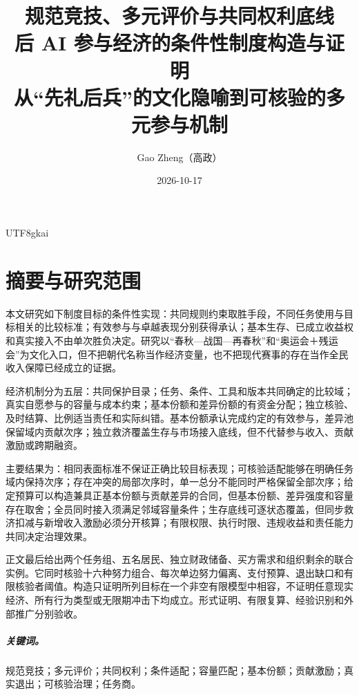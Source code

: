 \documentclass[12pt,a4paper,openany]{report}
\begin{document}
\begin{CJK*}{UTF8}{gkai}
\raggedbottom
{}
\title{规范竞技、多元评价与共同权利底线\\[0.6em]
\large 后 AI 参与经济的条件性制度构造与证明\\[0.5em]
\normalsize 从“先礼后兵”的文化隐喻到可核验的多元参与机制}
\author{Gao Zheng（高政）}
\date{2026-10-17}
\maketitle
\setcounter{page}{2}
\chapter*{摘要与研究范围}
本文研究如下制度目标的条件性实现：共同规则约束取胜手段，不同任务使用与目标相关的比较标准；有效参与与卓越表现分别获得承认；基本生存、已成立收益权和真实接入不由单次胜负决定。研究以“春秋—战国—再春秋”和“奥运会＋残运会”为文化入口，但不把朝代名称当作经济变量，也不把现代赛事的存在当作全民收入保障已经成立的证据。

经济机制分为五层：共同保护目录；任务、条件、工具和版本共同确定的比较域；真实自愿参与的容量与成本约束；基本份额和差异份额的有资金分配；独立核验、及时结算、比例适当责任和实际纠错。基本份额承认完成约定的有效参与，差异池保留域内贡献次序；独立救济覆盖生存与市场接入底线，但不代替参与收入、贡献激励或跨期融资。

主要结果为：相同表面标准不保证正确比较目标表现；可核验适配能够在明确任务域内保持次序；存在冲突的局部次序时，单一总分不能同时严格保留全部次序；给定预算可以构造兼具正基本份额与贡献差异的合同，但基本份额、差异强度和容量存在取舍；全员同时接入须满足邻域容量条件；生存底线可逐状态覆盖，但同步救济扣减与新增收入激励必须分开核算；有限权限、执行时限、违规收益和责任能力共同决定治理效果。

正文最后给出两个任务组、五名居民、独立财政储备、买方需求和组织剩余的联合实例。它同时核验十六种努力组合、每次单边努力偏离、支付预算、退出缺口和有限核验者阈值。构造只证明所列目标在一个非空有限模型中相容，不证明任意现实经济、所有行为类型或无限期冲击下均成立。形式证明、有限复算、经验识别和外部推广分别验收。

\paragraph{关键词。}规范竞技；多元评价；共同权利；条件适配；容量匹配；基本份额；贡献激励；真实退出；可核验治理；任务商。
\clearpage
\tableofcontents
\clearpage
{}


\end{CJK*}
\end{document}
